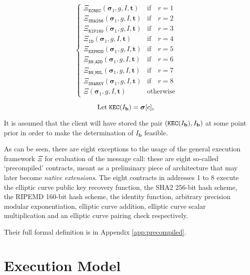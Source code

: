 \documentclass[9pt,oneside]{amsart}
\begin{document}
\begin{multicols}{2}
\begin{equation}
\begin{cases}
\Xi_{\mathtt{ECREC}}(\boldsymbol{\sigma}_1, g, I, \mathbf{t}) & \text{if} \quad r = 1 \\
\Xi_{\mathtt{SHA256}}(\boldsymbol{\sigma}_1, g, I, \mathbf{t}) & \text{if} \quad r = 2 \\
\Xi_{\mathtt{RIP160}}(\boldsymbol{\sigma}_1, g, I, \mathbf{t}) & \text{if} \quad r = 3 \\
\Xi_{\mathtt{ID}}(\boldsymbol{\sigma}_1, g, I, \mathbf{t}) & \text{if} \quad r = 4 \\
\Xi_{\mathtt{EXPMOD}}(\boldsymbol{\sigma}_1, g, I, \mathbf{t}) & \text{if} \quad r = 5 \\
\Xi_{\mathtt{BN\_ADD}}(\boldsymbol{\sigma}_1, g, I, \mathbf{t}) & \text{if} \quad r = 6 \\
\Xi_{\mathtt{BN\_MUL}}(\boldsymbol{\sigma}_1, g, I, \mathbf{t}) & \text{if} \quad r = 7 \\
\Xi_{\mathtt{SNARKV}}(\boldsymbol{\sigma}_1, g, I, \mathbf{t}) & \text{if} \quad r = 8 \\
\Xi(\boldsymbol{\sigma}_1, g, I, \mathbf{t}) & \text{otherwise} \end{cases}
\end{equation}

\begin{equation}
\text{Let} \; \mathtt{\tiny KEC}(I_{\mathbf{b}}) = \boldsymbol{\sigma}[c]_{\mathrm{c}}
\end{equation}

It is assumed that the client will have stored the pair $(\mathtt{\tiny KEC}(I_{\mathbf{b}}), I_{\mathbf{b}})$ at some point prior in order to make the determination of $I_{\mathbf{b}}$ feasible.

As can be seen, there are eight exceptions to the usage of the general execution framework $\Xi$ for evaluation of the message call: these are eight so-called `precompiled' contracts, meant as a preliminary piece of architecture that may later become \textit{native extensions}. The eight contracts in addresses 1 to 8 execute the elliptic curve public key recovery function, the SHA2 256-bit hash scheme, the RIPEMD 160-bit hash scheme, the identity function, arbitrary precision modular exponentiation, elliptic curve addition, elliptic curve scalar multiplication and an elliptic curve pairing check respectively.

Their full formal definition is in Appendix \ref{app:precompiled}.

\section{Execution Model} \label{ch:model}


\end{multicols}
\end{document}
